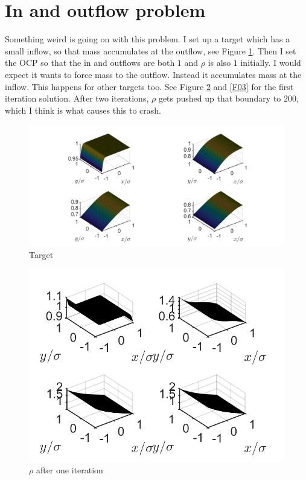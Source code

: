 \documentclass[11pt, a4paper]{article}
\theoremstyle{definition}
\begin{document}
	\section{In and outflow problem}
	Something weird is going on with this problem. I set up a target which has a small inflow, so that mass accumulates at the outflow, see Figure \ref{F01}. Then I set the OCP so that the in and outflows are both $1$ and $\rho$ is also $1$ initially. I would expect it wants to force mass to the outflow. Instead it accumulates mass at the inflow. This happens for other targets too.
	See Figure \ref{F02} and \ref{F03} for the first iteration solution. After two iterations, $\rho$ gets pushed up that boundary to $200$, which I think is what causes this to crash.
	\begin{figure}[h]
		\centering
		\includegraphics[scale=0.4]{InOutFW.png}
		\caption{Target} 
		\label{F01}
	\end{figure}
	\begin{figure}[h]
	\centering
	\includegraphics[scale=0.6]{InOutRho.png}
	\caption{$\rho$ after one iteration} 
	\label{F02}
    \end{figure}
\end{document}
